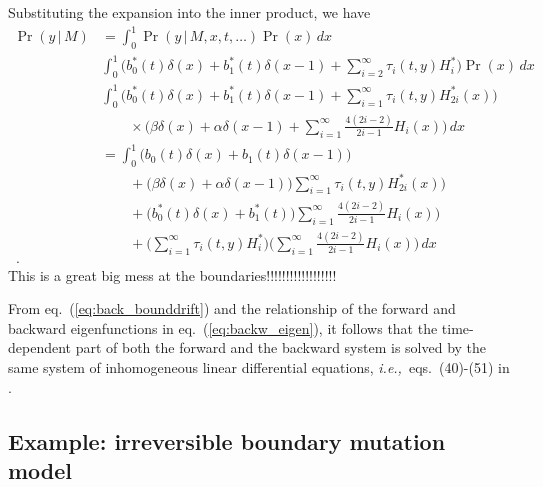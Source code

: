 \documentclass[preprint]{elsarticle}
\newcommand\given{{\,|\,}}
\newcommand\ie{{\it i.e.,}}
\begin{document}
Substituting the expansion into the inner product, we have
\begin{equation}\label{eq:inner_product}
\begin{split}
    \Pr(y\given M)&=\int_0^1 \Pr(y\given M, x, t,\dots)\Pr(x)\,dx\\
    &\int_0^1 \bigg(b_0^{*}(t)\delta(x)+b_1^{*}(t)\delta(x-1)+\sum_{i=2}^{\infty}\tau_i(t,y) H_i^{*}\bigg)\Pr(x)\,dx \\
    &\int_0^1 \bigg(b_0^{*}(t)\delta(x)+b_1^{*}(t)\delta(x-1)+\sum_{i=1}^{\infty}\tau_i(t,y) H_{2i}^{*}(x)\bigg)\\
    &\qquad\times \bigg(\beta\delta(x)+\alpha\delta(x-1)+\sum_{i=1}^{\infty}\frac{4(2i-2)}{2i-1} H_i(x)\bigg)\,dx \\
    &=\int_0^1 \bigg(b_0(t)\delta(x)+b_1(t)\delta(x-1)\bigg)\\
    &\qquad +\bigg(\beta\delta(x)+\alpha\delta(x-1)\bigg)\sum_{i=1}^{\infty}\tau_i(t,y) H_{2i}^{*}(x)\bigg)\\
    &\qquad +\bigg(b_0^{*}(t)\delta(x)+b_1^{*}(t)\bigg)\sum_{i=1}^{\infty}\frac{4(2i-2)}{2i-1} H_i(x)\bigg)\\
    &\qquad+ \bigg(\sum_{i=1}^{\infty}\tau_i(t,y) H_i^{*}\bigg)\bigg(\sum_{i=1}^{\infty}\frac{4(2i-2)}{2i-1} H_i(x)\bigg)\,dx \\
    \,.
\end{split}
\end{equation} 
This is a great big mess at the boundaries!!!!!!!!!!!!!!!!!!



From eq.~(\ref{eq:back_bounddrift}) and the relationship of the forward and backward eigenfunctions in eq.~(\ref{eq:backw_eigen}), it follows that the time-dependent part of both the forward and the backward system is solved by the same system of inhomogeneous linear differential equations, \ie\ eqs.~(40)-(51) in \citet{Vogl16}. 

\subsection{Example: irreversible boundary mutation model %
}\label{section:irreversible_diffusion}
\end{document}
